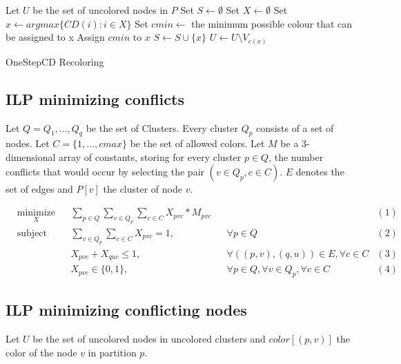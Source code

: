 \begin{algorithm}[h]
Let $U$ be the set of uncolored nodes in $P$\;
Set $S \gets \emptyset$\;
 {
  Set $X \gets \emptyset $\;
  Set $x \gets argmax\{CD(i) : i \in X \}$\;
  Set $cmin \gets$ the minimum possible colour that can be assigned to x\;
  Assign $cmin$ to $x$\;
  $S \gets S \cup \{x\}$\;
  $U \gets U \setminus V_{c(x)}$\;
}
\;
\caption{OneStepCD Recoloring}
\label{algo:osdc2}
\end{algorithm}

\clearpage

\subsection{ILP minimizing conflicts}

Let $Q = {Q_1,\ldots,Q_q}$ be the set of Clusters. Every cluster $Q_p$ consists of a set of nodes. Let $C=\{1,\ldots,cmax\}$ be the
set of allowed colors. Let $M$ be a 3-dimensional array of constants, storing
for every cluster $p \in Q$, the number conflicts that would occur by selecting the pair $(v \in Q_p, c \in C)$.
$E$ denotes the set of edges and $P[v]$ the cluster of node $v$.

\begin{equation*}[h]
\begin{aligned}
& \underset{X}{\text{minimize}} && \sum_{p \in Q}\sum_{v \in Q_p}\sum_{c \in C} X_{pvc} * M_{pvc}                    &&&(1)\\
& \text{subject to} && \sum_{v \in Q_p}\sum_{c \in C} X_{pvc}=1, && \forall p \in Q    &(2)\\
&&& X_{pvc}+X_{quc} \leq 1, && \forall ((p,v),(q,u)) \in E, \forall c \in C     &(3)\\
&&& X_{pvc} \in \{0,1\}, && \forall p \in Q, \forall v \in Q_p, \forall c \in C         &(4)
\end{aligned}
\end{equation*}


\subsection{ILP minimizing conflicting nodes}

Let $U$ be the set of uncolored nodes in uncolored clusters and $color[(p,v)]$ the color of the node $v$ in partition $p$.

